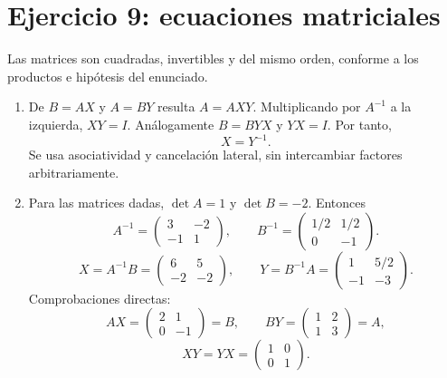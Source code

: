 \documentclass[11pt]{article}
\begin{document}
\section*{Ejercicio 9: ecuaciones matriciales}
Las matrices son cuadradas, invertibles y del mismo orden, conforme a los productos e hipótesis del enunciado.
\begin{enumerate}[label=(\alph*)]
\item De $B=AX$ y $A=BY$ resulta $A=AXY$. Multiplicando por $A^{-1}$ a la izquierda, $XY=I$. Análogamente $B=BYX$ y $YX=I$. Por tanto,
\[
\boxed{X=Y^{-1}}.
\]
Se usa asociatividad y cancelación lateral, sin intercambiar factores arbitrariamente.
\item Para las matrices dadas, $\det A=1$ y $\det B=-2$. Entonces
\[
A^{-1}=\begin{pmatrix}3&-2\\-1&1\end{pmatrix},\qquad
B^{-1}=\begin{pmatrix}1/2&1/2\\0&-1\end{pmatrix}.
\]
\[
\boxed{X=A^{-1}B=\begin{pmatrix}6&5\\-2&-2\end{pmatrix}},\qquad
\boxed{Y=B^{-1}A=\begin{pmatrix}1&5/2\\-1&-3\end{pmatrix}}.
\]
Comprobaciones directas:
\[
AX=\begin{pmatrix}2&1\\0&-1\end{pmatrix}=B,\qquad
BY=\begin{pmatrix}1&2\\1&3\end{pmatrix}=A,
\]
\[
XY=YX=\begin{pmatrix}1&0\\0&1\end{pmatrix}.
\]
\end{enumerate}
\end{document}
